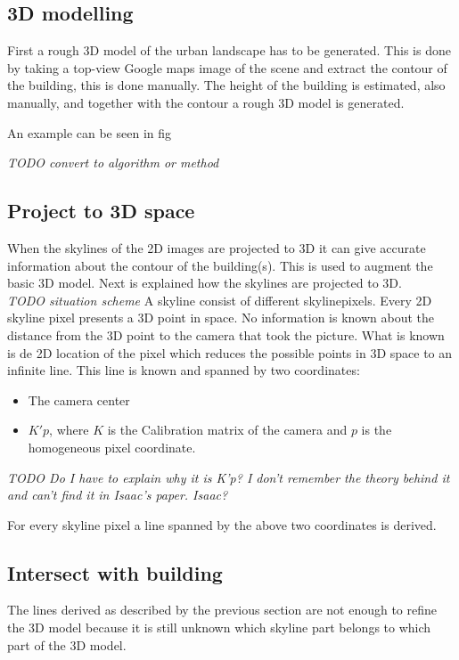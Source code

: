 \documentclass[10pt]{article}
\begin{document}
   \subsection{3D modelling}
First a rough 3D model of the urban landscape has to be generated. This is done
by taking a top-view Google maps image of the scene and extract the contour of
the building, this is done manually. 
The height of the building is estimated, also manually, and together with the
contour a rough 3D model is generated. 

An example can be seen in fig



\textit{TODO convert to algorithm or method }
\subsection{Project to 3D space}
When the skylines of the 2D images are projected to 3D it can give 
accurate information about the contour of the building(s). This is used to
augment the basic 3D model.  Next is explained how the skylines are projected to
3D.\\

\textit{TODO situation scheme}
A skyline consist of different skylinepixels. Every 2D skyline pixel presents a 3D point in space. No
information is known about the distance from the 3D point to the camera that
took the picture. What is known is de 2D location of the pixel which reduces the possible points in 3D
space to an infinite line.  This line is known and spanned by two 
coordinates:\\ 
\begin{itemize}
	\item The camera center %
	\item $K'p$, where $K$ is the Calibration matrix of the camera and $p$ is the homogeneous pixel coordinate.
\end{itemize}

\textit{ TODO Do I have to explain why it is K'p? I don't remember the theory behind it and can't find it in
Isaac's paper. Isaac? }

For every skyline pixel a line spanned by the above two coordinates is derived.


\subsection{Intersect with building}
The lines derived as described by the previous section are not enough to refine
the 3D model because it is still unknown which skyline part belongs to which
part of the 3D model.
\end{document}
